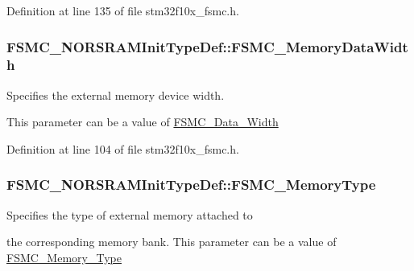 Definition at line 135 of file stm32f10x\-\_\-fsmc.\-h.

\hypertarget{struct_f_s_m_c___n_o_r_s_r_a_m_init_type_def_a1791c771ff86f5dc5422040409517e9d}{
\subsubsection[{F\-S\-M\-C\-\_\-\-Memory\-Data\-Width}]{ F\-S\-M\-C\-\_\-\-N\-O\-R\-S\-R\-A\-M\-Init\-Type\-Def\-::\-F\-S\-M\-C\-\_\-\-Memory\-Data\-Width}}\label{struct_f_s_m_c___n_o_r_s_r_a_m_init_type_def_a1791c771ff86f5dc5422040409517e9d}
\begin{DoxyVerb}     Specifies the external memory device width.
\end{DoxyVerb}
 This parameter can be a value of \hyperlink{group___f_s_m_c___data___width}{F\-S\-M\-C\-\_\-\-Data\-\_\-\-Width} 

Definition at line 104 of file stm32f10x\-\_\-fsmc.\-h.

\hypertarget{struct_f_s_m_c___n_o_r_s_r_a_m_init_type_def_a979ad605c6a63923e060576ee01e888d}{
\subsubsection[{F\-S\-M\-C\-\_\-\-Memory\-Type}]{ F\-S\-M\-C\-\_\-\-N\-O\-R\-S\-R\-A\-M\-Init\-Type\-Def\-::\-F\-S\-M\-C\-\_\-\-Memory\-Type}}\label{struct_f_s_m_c___n_o_r_s_r_a_m_init_type_def_a979ad605c6a63923e060576ee01e888d}
\begin{DoxyVerb}          Specifies the type of external memory attached to
\end{DoxyVerb}
 the corresponding memory bank. This parameter can be a value of \hyperlink{group___f_s_m_c___memory___type}{F\-S\-M\-C\-\_\-\-Memory\-\_\-\-Type} 

